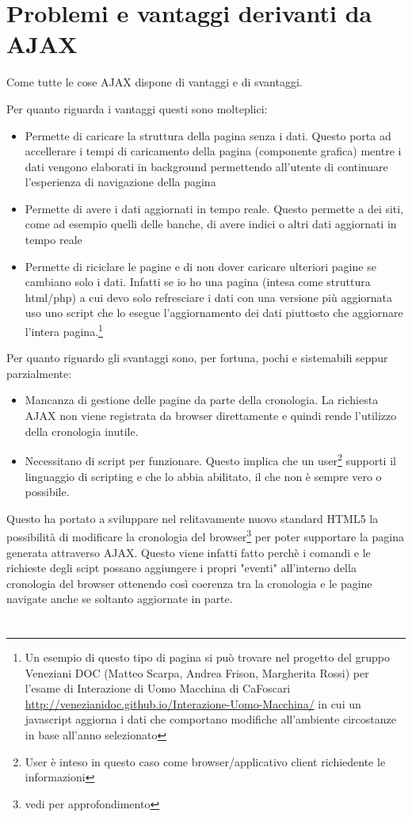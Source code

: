 \documentclass[a4paper,12pt]{report}
\begin{document}
\section{Problemi e vantaggi derivanti da AJAX}
Come tutte le cose AJAX dispone di vantaggi e di svantaggi.

Per quanto riguarda i vantaggi questi sono molteplici:
\begin{itemize}
\item Permette di caricare la struttura della pagina senza i dati. Questo porta ad accellerare i tempi di caricamento della pagina (componente grafica) mentre i dati vengono elaborati in background permettendo all'utente di continuare l'esperienza di navigazione della pagina
\item Permette di avere i dati aggiornati in tempo reale. Questo permette a dei siti, come ad esempio quelli delle banche, di avere indici o altri dati aggiornati in tempo reale
\item Permette di riciclare le pagine e di non dover caricare ulteriori pagine se cambiano solo i dati. Infatti se io ho una pagina (intesa come struttura html/php) a cui devo solo refresciare i dati con una versione più aggiornata uso uno script che lo esegue l'aggiornamento dei dati piuttosto che aggiornare l'intera pagina.\footnote{Un esempio di questo tipo di pagina si può trovare nel progetto del gruppo Veneziani DOC (Matteo Scarpa, Andrea Frison, Margherita Rossi) per l'esame di Interazione di Uomo Macchina di CaFoscari \url{http://venezianidoc.github.io/Interazione-Uomo-Macchina/} in cui un javascript aggiorna i dati che comportano modifiche all'ambiente circostanze in base all'anno selezionato}
\end{itemize}

Per quanto riguardo gli svantaggi sono, per fortuna, pochi e sistemabili seppur parzialmente:
\begin{itemize}
\item Mancanza di gestione delle pagine da parte della cronologia. La richiesta AJAX non viene registrata da browser direttamente e quindi rende l'utilizzo della cronologia inutile.
\item Necessitano di script per funzionare. Questo implica che un user\footnote{User è inteso in questo caso come browser/applicativo client richiedente le informazioni} supporti il linguaggio di scripting e che lo abbia abilitato, il che non è sempre vero o possibile.
\end{itemize}

Questo ha portato a sviluppare nel relitavamente nuovo standard HTML5 la possibilità di modificare la cronologia del browser\footnote{vedi \cites{site:w3chtml5} per approfondimento} per poter supportare la pagina generata attraverso AJAX. Questo viene infatti fatto perchè i comandi e le richieste degli scipt possano aggiungere i propri "eventi" all'interno della cronologia del browser ottenendo così coerenza tra la cronologia e le pagine navigate anche se soltanto aggiornate in parte.

\newpage
\section*{\refname}
\printbibliography[heading=web, nottype=book]
\printbibliography[heading=libri, type=book]
\end{document}
